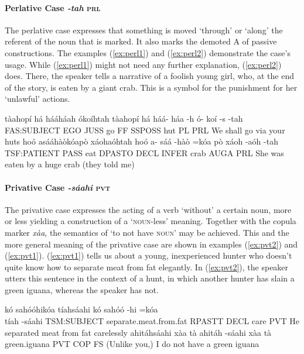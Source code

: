 \documentclass[a4paper, 12pt, oneside]{memoir}
\newcommand{\emh}[1]{\textit{#1}}
\begin{document}
\paragraph{Perlative Case \emh{-tah} \textsc{prl}}\label{s:perlative}
The perlative case expresses that something is moved `through' or `along' the referent of the noun that is marked. It also marks the demoted A of passive constructions. The examples (\ref{ex:perl1}) and (\ref{ex:perl2}) demonstrate the case's usage. While (\ref{ex:perl1}) might not need any further explanation, (\ref{ex:perl2}) does. There, the speaker tells a narrative of a foolish young girl, who, at the end of the story, is eaten by a giant crab. This is a symbol for the punishment for her `unlawful' actions.
\begin{examples}
\newbaarucmd{\cl}{\baarujuncture{\texttt{==}}}
\ex \label{ex:perl1}
\words tàahopí há hááháah ókoíhtah
\bits tàahopí há háá- háa -h ó- koí -s -tah 
\gloss FAS:SUBJECT EGO JUSS go FF SSPOSS hut PL PRL
\tr We shall go via your huts
\ex \label{ex:perl2}
\words hoó asááhàòkóapò xáohaóhtah
\bits hoó a- sáá -hàò =kóa \cl pò xáoh -aóh -tah
\gloss TSF:PATIENT PASS eat DPASTO DECL INFER crab AUGA PRL
\tr She was eaten by a huge crab (they told me)
\end{examples}
\paragraph{Privative Case \emh{-sáahi} \textsc{pvt}}
The privative case expresses the acting of a verb `without' a certain noun, more or less yielding a construction of a `\textsc{noun}-less' meaning. Together with the copula marker \textit{xàa}, the semantics of `to not have \textsc{noun}' may be achieved. This and the more general meaning of the privative case are shown in examples (\ref{ex:pvt2}) and (\ref{ex:pvt1}). (\ref{ex:pvt1}) tells us about a young, inexperienced hunter who doesn't quite know how to separate meat from fat elegantly. In (\ref{ex:pvt2}), the speaker utters this sentence in the context of a hunt, in which another hunter has slain a green iguana, whereas the speaker has not.
\begin{examples}
\ex \label{ex:pvt1}
\words kó sahóóhikóa tíahsáahi
\bits kó sahóó -hi =kóa \\ tíah -sáahi
\gloss TSM:SUBJECT separate.meat.from.fat RPASTT DECL care PVT
\tr He separated meat from fat carelessly
\ex \label{ex:pvt2}
\words ahitáhsáahi xàa tà
\bits ahitáh -sáahi xàa tà
\gloss green.iguana PVT COP FS
\tr (Unlike you,) I do not have a green iguana
\end{examples}
\end{document}
